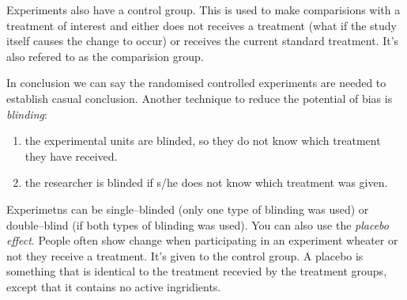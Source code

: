Experiments also have a control group. This is used to make comparisions with a
treatment of interest and either does not receives a treatment (what if the
study itself causes the change to occur) or receives the current standard
treatment. It's also refered to as the comparision group.

In conclusion we can say the randomised controlled experiments are needed to
establish casual conclusion. Another technique to reduce the potential of bias
is \emph{blinding}: 
\begin{enumerate}
  \item the experimental units are blinded, so they do not know which treatment
  they have received.
  \item the researcher is blinded if s/he does not know which treatment was
  given.
\end{enumerate}

Experimetns can be single--blinded (only one type of blinding was used) or
double--blind (if both types of blinding was used). You can also use the
\emph{placebo effect}. People often show change when participating in an
experiment wheater or not they receive a treatment. It's given to the control
group. A placebo is something that is identical to the treatment recevied by the
treatment groups, except that it contains no active ingridients.
